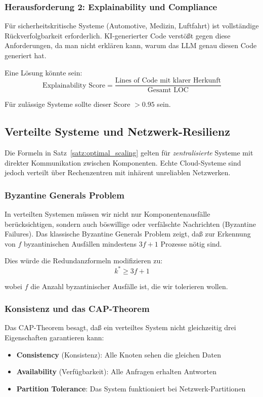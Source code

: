 \documentclass[a4paper,11pt]{article}
\theoremstyle{definition}
\begin{document}
\subsubsection{Herausforderung 2: Explainability und Compliance}

Für sicherheitskritische Systeme (Automotive, Medizin, Luftfahrt) ist vollständige 
Rückverfolgbarkeit erforderlich. KI-generierter Code verstößt gegen diese Anforderungen, 
da man nicht erklären kann, warum das LLM genau diesen Code generiert hat.

Eine Lösung könnte sein:
\[
    \text{Explainability Score} = \frac{\text{Lines of Code mit klarer Herkunft}}{\text{Gesamt LOC}}
\]

Für zulässige Systeme sollte dieser Score $> 0.95$ sein.

\subsection{Verteilte Systeme und Netzwerk-Resilienz}

Die Formeln in Satz~\ref{satz:optimal_scaling} gelten für \emph{zentralisierte} Systeme 
mit direkter Kommunikation zwischen Komponenten. Echte Cloud-Systeme sind jedoch verteilt 
über Rechenzentren mit inhärent unreliablen Netzwerken.

\subsubsection{Byzantine Generals Problem}

In verteilten Systemen müssen wir nicht nur Komponentenausfälle berücksichtigen, sondern auch 
böswillige oder verfälschte Nachrichten (Byzantine Failures). Das klassische Byzantine Generals 
Problem zeigt, daß zur Erkennung von $f$ byzantinischen Ausfällen mindestens $3f + 1$ Prozesse 
nötig sind.

Dies würde die Redundanzformeln modifizieren zu:
\[
    k^* \geq 3f + 1
\]

wobei $f$ die Anzahl byzantinischer Ausfälle ist, die wir tolerieren wollen.

\subsubsection{Konsistenz und das CAP-Theorem}

Das CAP-Theorem besagt, daß ein verteiltes System nicht gleichzeitig drei Eigenschaften 
garantieren kann:
\begin{itemize}
    \item \textbf{Consistency} (Konsistenz): Alle Knoten sehen die gleichen Daten
    \item \textbf{Availability} (Verfügbarkeit): Alle Anfragen erhalten Antworten
    \item \textbf{Partition Tolerance}: Das System funktioniert bei Netzwerk-Partitionen
\end{itemize}
\end{document}
